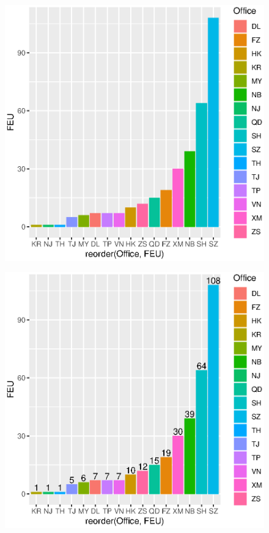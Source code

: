 \documentclass[a4paper]{article}
\begin{document}
		\begin{figure}
		\begin{center}
		\includegraphics{Rplot03}
		\end{center}
		\end{figure}
		\begin{figure}
		\begin{center}
		\includegraphics{Rplot04}
		\end{center}
		\end{figure}
\end{document}
